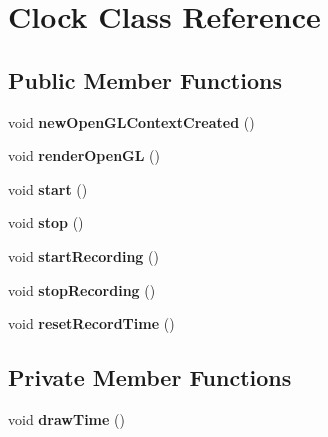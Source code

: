 \hypertarget{classClock}{\section{Clock Class Reference}
\label{classClock}
}
\subsection*{Public Member Functions}
\begin{DoxyCompactItemize}
\item 
\hypertarget{classClock_abd26fded5ca74645f824263eedd5d149}{void {\bfseries new\-Open\-G\-L\-Context\-Created} ()}\label{classClock_abd26fded5ca74645f824263eedd5d149}

\item 
\hypertarget{classClock_acb8d757927a85fa7bcc1719ad8f1befb}{void {\bfseries render\-Open\-G\-L} ()}\label{classClock_acb8d757927a85fa7bcc1719ad8f1befb}

\item 
\hypertarget{classClock_a8a050959dcff11c85d695989e9099a8c}{void {\bfseries start} ()}\label{classClock_a8a050959dcff11c85d695989e9099a8c}

\item 
\hypertarget{classClock_a0b77c3e7f33eb7ae0f018e469d96a250}{void {\bfseries stop} ()}\label{classClock_a0b77c3e7f33eb7ae0f018e469d96a250}

\item 
\hypertarget{classClock_a511b216e6790ed5f6a3fb0efb81f4f35}{void {\bfseries start\-Recording} ()}\label{classClock_a511b216e6790ed5f6a3fb0efb81f4f35}

\item 
\hypertarget{classClock_a5615aaadf1c8237600a3feb09e97a4eb}{void {\bfseries stop\-Recording} ()}\label{classClock_a5615aaadf1c8237600a3feb09e97a4eb}

\item 
\hypertarget{classClock_a7e418d2617549af2d6dfc6975107afe2}{void {\bfseries reset\-Record\-Time} ()}\label{classClock_a7e418d2617549af2d6dfc6975107afe2}

\end{DoxyCompactItemize}
\subsection*{Private Member Functions}
\begin{DoxyCompactItemize}
\item 
\hypertarget{classClock_aae294e89b1ea10898ee854c411bfb867}{void {\bfseries draw\-Time} ()}\label{classClock_aae294e89b1ea10898ee854c411bfb867}

\end{DoxyCompactItemize}
